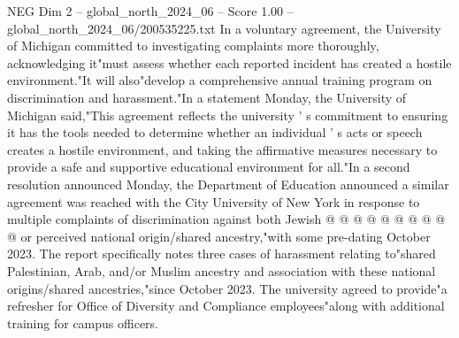 \begin{textsample}{NEG Dim 2 – global\_north\_2024\_06 – Score 1.00 – global\_north\_2024\_06/200535225.txt}
In a voluntary agreement, the University of Michigan committed to investigating complaints more thoroughly, acknowledging it"must assess whether each reported incident has created a hostile environment."It will also"develop a comprehensive annual training program on discrimination and harassment."In a statement Monday, the University of Michigan said,"This agreement reflects the university ' s commitment to ensuring it has the tools needed to determine whether an individual ' s acts or speech creates a hostile environment, and taking the affirmative measures necessary to provide a safe and supportive educational environment for all."In a second resolution announced Monday, the Department of Education announced a similar agreement was reached with the City University of New York in response to multiple complaints of discrimination against both Jewish @ @ @ @ @ @ @ @ @ @ or perceived national origin/shared ancestry,"with some pre-dating October 2023.
The report specifically notes three cases of harassment relating to"shared Palestinian, Arab, and/or Muslim ancestry and association with these national origins/shared ancestries,"since October 2023.
The university agreed to provide"a refresher for Office of Diversity and Compliance employees"along with additional training for campus officers.

\end{textsample}
